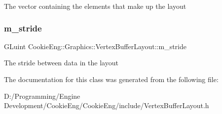 The vector containing the elements that make up the layout \mbox{\label{class_cookie_eng_1_1_graphics_1_1_vertex_buffer_layout_a972f0e9224f28b13be7d959449423308}} 
\subsubsection{\texorpdfstring{m\+\_\+stride}{m\_stride}}
{\footnotesize\ttfamily G\+Luint Cookie\+Eng\+::\+Graphics\+::\+Vertex\+Buffer\+Layout\+::m\+\_\+stride\hspace{0.3cm}{\ttfamily [protected]}}

The stride between data in the layout 

The documentation for this class was generated from the following file\+:\begin{DoxyCompactItemize}
\item 
D\+:/\+Programming/\+Engine Development/\+Cookie\+Eng/\+Cookie\+Eng/include/Vertex\+Buffer\+Layout.\+h\end{DoxyCompactItemize}
